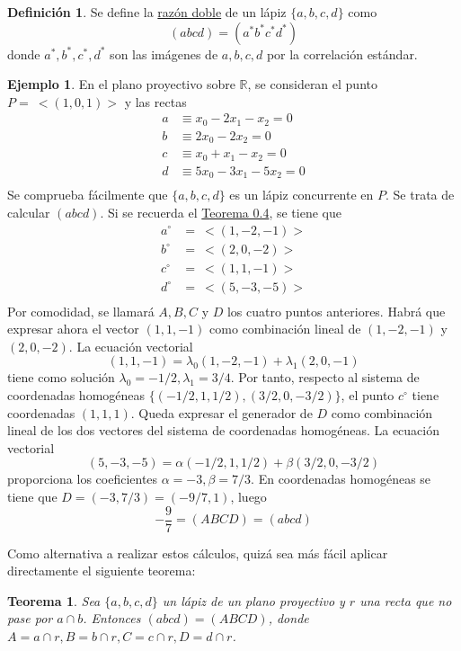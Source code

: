 \documentclass[12pt]{report}
\newtheorem{theorem}{Teorema}[chapter]
\theoremstyle{definition}
\newtheorem{definition}{Definición}[chapter]
\theoremstyle{definition}
\newtheorem{example}{Ejemplo}[chapter]
\theoremstyle{remark}
\newcommand{\R}{\mathbb R}
\begin{document}
\begin{definition}
Se define la \ul{razón doble} de un lápiz $\{a,b,c,d\}$ como
\[(abcd) = (a^* b^* c^* d^*)\]
donde $a^*, b^*, c^*, d^*$ son las imágenes de $a, b, c, d$ por la correlación estándar.
\end{definition}

\begin{example}
En el plano proyectivo sobre $\R$, se consideran el punto $P = \ <(1,0,1)>$ y las rectas
\[
\begin{aligned}
a &\equiv x_0-2x_1-x_2=0\\
b &\equiv 2x_0-2x_2=0\\
c &\equiv x_0+x_1-x_2=0\\
d &\equiv 5x_0-3x_1-5x_2=0\\
\end{aligned}
\]
Se comprueba fácilmente que $\{a,b,c,d\}$ es un lápiz concurrente en $P$. Se trata de calcular $(abcd)$. Si se recuerda el \hyperref[teo0.4.]{\color{blue}Teorema 0.4}, se tiene que
\[
\begin{aligned}
a^\circ &= \ <(1,-2,-1)>\\
b^\circ &= \ <(2,0,-2)>\\
c^\circ &= \ <(1,1,-1)>\\
d^\circ &= \ <(5,-3,-5)>\\
\end{aligned}
\]
Por comodidad, se llamará $A, B, C $ y $D$ los cuatro puntos anteriores. Habrá que expresar ahora el vector $(1,1,-1)$ como combinación lineal de $(1,-2,-1)$ y $(2,0,-2)$. La ecuación vectorial
\[(1,1,-1) = \lambda_0(1,-2,-1)+\lambda_1(2,0,-1) \]
tiene como solución $\lambda_0 = -1/2, \lambda_1 = 3/4$. Por tanto, respecto al sistema de coordenadas homogéneas $\{(-1/2,1,1/2), (3/2,0,-3/2)\}$, el punto $c^\circ$ tiene coordenadas $(1,1,1)$. Queda expresar el generador de $D$ como combinación lineal de los dos vectores del sistema de coordenadas homogéneas. La ecuación vectorial
\[(5,-3,-5) = \alpha (-1/2,1,1/2)+\beta(3/2,0,-3/2)\]
proporciona los coeficientes $\alpha = -3, \beta = 7/3$. En coordenadas homogéneas se tiene que $D = (-3,7/3) = (-9/7,1)$, luego
\[-\frac{9}{7} = (ABCD) = (abcd)\]
\end{example}

Como alternativa a realizar estos cálculos, quizá sea más fácil aplicar directamente el siguiente teorema:

\begin{theorem}
Sea $\{a,b,c,d\}$ un lápiz de un plano proyectivo y $r$ una recta que no pase por $a \cap b$. Entonces $(abcd) = (ABCD)$, donde $A = a \cap r, B = b \cap r, C = c \cap r, D = d \cap r$.
\end{theorem}
\end{document}
